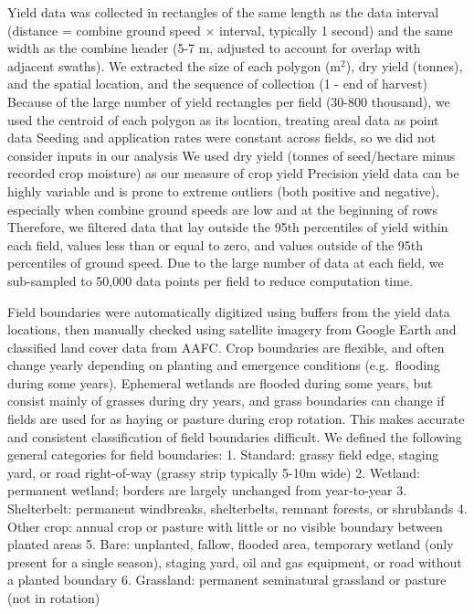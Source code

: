 \documentclass[]{elsarticle} %
\begin{document}
Yield data was collected in rectangles of the same length as the data interval (distance = combine ground speed \(\times\) interval, typically 1 second) and the same width as the combine header (5-7 m, adjusted to account for overlap with adjacent swaths).
We extracted the size of each polygon (m\(^2\)), dry yield (tonnes), and the spatial location, and the sequence of collection (1 - end of harvest)
Because of the large number of yield rectangles per field (30-800 thousand), we used the centroid of each polygon as its location, treating areal data as point data
Seeding and application rates were constant across fields, so we did not consider inputs in our analysis
We used dry yield (tonnes of seed/hectare minus recorded crop moisture) as our measure of crop yield
Precision yield data can be highly variable and is prone to extreme outliers (both positive and negative), especially when combine ground speeds are low and at the beginning of rows
Therefore, we filtered data that lay outside the 95th percentiles of yield within each field, values less than or equal to zero, and values outside of the 95th percentiles of ground speed.
Due to the large number of data at each field, we sub-sampled to 50,000 data points per field to reduce computation time.

Field boundaries were automatically digitized using buffers from the yield data locations, then manually checked using satellite imagery from Google Earth and classified land cover data from AAFC.
Crop boundaries are flexible, and often change yearly depending on planting and emergence conditions (e.g.~flooding during some years).
Ephemeral wetlands are flooded during some years, but consist mainly of grasses during dry years, and grass boundaries can change if fields are used for as haying or pasture during crop rotation.
This makes accurate and consistent classification of field boundaries difficult.
We defined the following general categories for field boundaries:
1. Standard: grassy field edge, staging yard, or road right-of-way (grassy strip typically 5-10m wide)
2. Wetland: permanent wetland; borders are largely unchanged from year-to-year
3. Shelterbelt: permanent windbreaks, shelterbelts, remnant forests, or shrublands
4. Other crop: annual crop or pasture with little or no visible boundary between planted areas
5. Bare: unplanted, fallow, flooded area, temporary wetland (only present for a single season), staging yard, oil and gas equipment, or road without a planted boundary
6. Grassland: permanent seminatural grassland or pasture (not in rotation)
\end{document}
